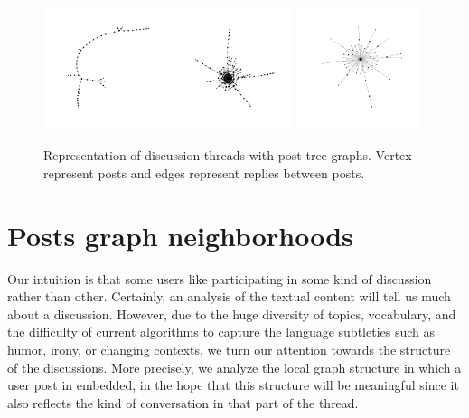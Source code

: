 \documentclass[smallextended]{svjour3}          %
\begin{document}
\begin{figure}
	\centering
	\includegraphics[width=0.32\textwidth]{tree1}
	\includegraphics[width=0.32\textwidth]{tree2}
	\includegraphics[width=0.32\textwidth]{tree3}
	\caption{Representation of discussion threads with post tree graphs. Vertex represent posts and edges represent replies between posts.}
	\label{fig:trees}
\end{figure}
\section{Posts graph neighborhoods}

Our intuition is that some users like participating in some kind of discussion rather than other. Certainly, an analysis of the textual content will tell us much about a discussion. However, due to the huge diversity of topics, vocabulary, and the difficulty of current algorithms to capture the language subtleties such as humor, irony, or changing contexts, we turn our attention towards the structure of the discussions. More precisely, we analyze the local graph structure in which a user post in embedded, in the hope that this structure will be meaningful since it also reflects the kind of conversation in that part of the thread.
\end{document}
